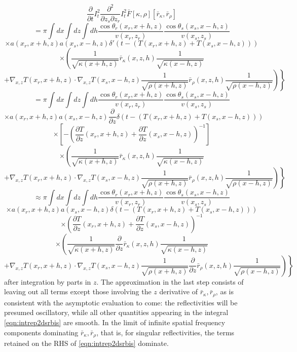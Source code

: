 \[
\frac{\partial}{\partial t}I_t^2\frac{\partial^2}{\partial z_s \partial z_r}
I_t^2\bar{F}[\kappa,\rho][\bar{r}_{\kappa},\bar{r}_{\rho}]
\]
\[
=\pi\int dx \int dz \int dh \frac{\cos \theta_r(x_r,x+h,z)}{v(x_r,z_r)}
\frac{\cos \theta_s(x_s,x-h,z)}{v(x_s,z_s)}
\]
\[
\times a(x_r,x+h,z) a(x_s,x-h,z) 
\delta'(t-(T(x_r,x+h,z)+T(x_s,x-h,z))) 
\]
\[
\times \left(\frac{1}{\sqrt{\kappa(x+h,z)}} \bar{r}_{\kappa}(x,z,h) \frac{1}{\sqrt{\kappa(x-h,z)}}
\right. 
\]
\[
+\left. \left. 
   \nabla_{x,z}  T(x_r,x+h,z) \cdot \nabla_{x,z} T(x_s,x-h,z) 
\frac{1}{\sqrt{\rho(x+h,z)}}  \bar{r}_{\rho}(x,z,h) \frac{1}{\sqrt{\rho(x-h,z)}}
\right)\right\}
\]
\[
=\pi\int dx \int dz \int dh \frac{\cos \theta_r(x_r,x+h,z)}{v(x_r,z_r)}
\frac{\cos \theta_s(x_s,x-h,z)}{v(x_s,z_s)}
\]
\[
\times a(x_r,x+h,z) a(x_s,x-h,z) 
\frac{\partial}{\partial z}\delta(t-(T(x_r,x+h,z)+T(x_s,x-h,z))) 
\]
\[
  \times \left[-\left(\frac{\partial T}{\partial 
  z}(x_r,x+h,z) + \frac{\partial T}{\partial z}(x_s,x-h,z)\right)^{-1}\right] 
\]
\[
\times \left(\frac{1}{\sqrt{\kappa(x+h,z)}} \bar{r}_{\kappa}(x,z,h) \frac{1}{\sqrt{\kappa(x-h,z)}}
\right. 
\]
\[
+\left. \left. 
   \nabla_{x,z}  T(x_r,x+h,z) \cdot \nabla_{x,z} T(x_s,x-h,z) 
\frac{1}{\sqrt{\rho(x+h,z)}}  \bar{r}_{\rho}(x,z,h) \frac{1}{\sqrt{\rho(x-h,z)}}
\right)\right\}
\]
\[
\approx \pi\int dx \int dz \int dh \frac{\cos \theta_r(x_r,x+h,z)}{v(x_r,z_r)}
\frac{\cos \theta_s(x_s,x-h,z)}{v(x_s,z_s)}
\]
\[
\times a(x_r,x+h,z) a(x_s,x-h,z) 
\delta(t-(T(x_r,x+h,z)+T(x_s,x-h,z))) 
\]
\[
  \times \left(\frac{\partial T}{\partial 
  z}(x_r,x+h,z) + \frac{\partial T}{\partial z}(x_s,x-h,z)\right)^{-1}
\]
\[
\times \left(\frac{1}{\sqrt{\kappa(x+h,z)}} \frac{\partial}{\partial z}\bar{r}_{\kappa}(x,z,h) \frac{1}{\sqrt{\kappa(x-h,z)}}
\right. 
\]
\begin{equation}
\label{eqn:intrep2dsrbis}
+\left. \left. 
   \nabla_{x,z}  T(x_r,x+h,z) \cdot \nabla_{x,z} T(x_s,x-h,z) 
\frac{1}{\sqrt{\rho(x+h,z)}}  \frac{\partial}{\partial z} \bar{r}_{\rho}(x,z,h) \frac{1}{\sqrt{\rho(x-h,z)}}
\right)\right\}
\end{equation}
after integration by parts in $z$. The approximation in the last step
consists of leaving out all terms except those involving the $z$
derivative of $\bar{r}_{\kappa}, \bar{r}_{\rho}$, as is consistent
with the asymptotic evaluation to come: the reflectivities will be
presumed oscillatory, while all other quantities appearing in the
integral \ref{eqn:intrep2dsrbis} are smooth. In the limit of infinite
spatial frequency components dominating $\bar{r}_{\kappa},
\bar{r}_{\rho}$, that is, for singular reflectivities, the terms
retained on the RHS of \ref{eqn:intrep2dsrbis} dominate. 

